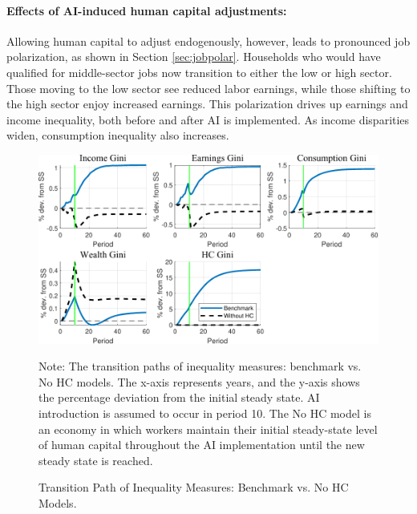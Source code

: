 \documentclass[12pt]{article}
\begin{document}
\paragraph{Effects of AI-induced human capital adjustments:}
Allowing human capital to adjust endogenously, however, leads to pronounced job polarization, as shown in Section \ref{sec:jobpolar}. Households who would have qualified for middle-sector jobs now transition to either the low or high sector. Those moving to the low sector see reduced labor earnings, while those shifting to the high sector enjoy increased earnings. This polarization drives up earnings and income inequality, both before and after AI is implemented. As income disparities widen, consumption inequality also increases.




\begin{figure}
\begin{centering}
\caption{\protect\label{fig:no_hc_gini}Transition Path of Inequality Measures:
Benchmark vs. No HC Models.}
\par
\includegraphics[width=0.95\linewidth]{figure_204040calib/nohc_gini.pdf}
\par\end{centering}
{\scriptsize Note:  The transition paths of inequality measures: benchmark vs. No HC models. The x-axis represents years, and the y-axis shows the percentage deviation from the initial steady state. AI introduction is assumed to occur in period 10. The No HC model is an economy in which workers maintain their initial steady-state level of human capital throughout the AI implementation until the new steady state is reached.}{\scriptsize\par}


\end{figure}
\end{document}
